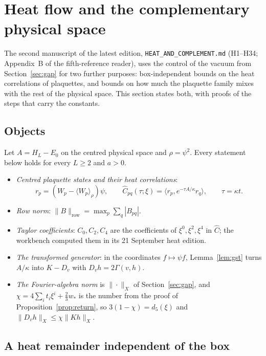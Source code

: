 \section{Heat flow and the complementary physical space}\label{sec:heat}

The second manuscript of the latest edition, \texttt{HEAT\_AND\_COMPLEMENT.md} (H1--H34; Appendix~B of the fifth-reference reader), uses the control of the vacuum from Section~\ref{sec:gap} for two further purposes: box-independent bounds on the heat correlations of plaquettes, and bounds on how much the plaquette family mixes with the rest of the physical space. This section states both, with proofs of the steps that carry the constants.

\subsection{Objects}

Let $A=H_L-E_0$ on the centred physical space and $\rho=\psi^2$. Every statement below holds for every $L\ge2$ and $a>0$.
\begin{itemize}
\item \emph{Centred plaquette states and their heat correlations}:
\[
r_p=(W_p-\langle W_p\rangle_\rho)\psi,\qquad \widehat C_{pq}(\tau;\xi)=\langle r_p,e^{-\tau A/\kappa}r_q\rangle,\qquad\tau=\kappa t.
\]
\item \emph{Row norm}: $\|B\|_{\mathrm{row}}=\max_p\sum_q|B_{pq}|$.
\item \emph{Taylor coefficients}: $C_0,C_2,C_4$ are the coefficients of $\xi^0,\xi^2,\xi^4$ in $\widehat C$; the workbench computed them in its 21 September heat edition.
\item \emph{The transformed generator}: in the coordinates $f\mapsto\psi f$, Lemma~\ref{lem:gst} turns $A/\kappa$ into $K-D_v$ with $D_vh=2\Gamma(v,h)$.
\item \emph{The Fourier-algebra norm} is $\|\cdot\|_X$ of Section~\ref{sec:gap}, and $\chi=4\sum_it_i\xi^i+\frac23w_*$ is the number from the proof of Proposition~\ref{prop:return}, so $3(1-\chi)=d_5(\xi)$ and $\|D_vh\|_X\le\chi\|Kh\|_X$.
\end{itemize}

\subsection{A heat remainder independent of the box}

